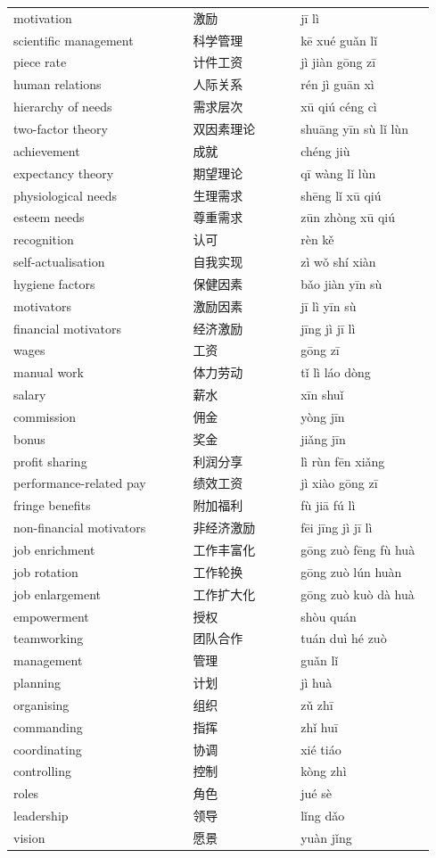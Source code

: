 \documentclass[11pt]{article}
\begin{document}
\begin{longtable}{@{}p{0.40\linewidth}p{0.24\linewidth}p{0.30\linewidth}@{}}
motivation & 激励 & jī lì \\
scientific management & 科学管理 & kē xué guǎn lǐ \\
piece rate & 计件工资 & jì jiàn gōng zī \\
human relations & 人际关系 & rén jì guān xì \\
hierarchy of needs & 需求层次 & xū qiú céng cì \\
two-factor theory & 双因素理论 & shuāng yīn sù lǐ lùn \\
achievement & 成就 & chéng jiù \\
expectancy theory & 期望理论 & qī wàng lǐ lùn \\
physiological needs & 生理需求 & shēng lǐ xū qiú \\
esteem needs & 尊重需求 & zūn zhòng xū qiú \\
recognition & 认可 & rèn kě \\
self-actualisation & 自我实现 & zì wǒ shí xiàn \\
hygiene factors & 保健因素 & bǎo jiàn yīn sù \\
motivators & 激励因素 & jī lì yīn sù \\
financial motivators & 经济激励 & jīng jì jī lì \\
wages & 工资 & gōng zī \\
manual work & 体力劳动 & tǐ lì láo dòng \\
salary & 薪水 & xīn shuǐ \\
commission & 佣金 & yòng jīn \\
bonus & 奖金 & jiǎng jīn \\
profit sharing & 利润分享 & lì rùn fēn xiǎng \\
performance-related pay & 绩效工资 & jì xiào gōng zī \\
fringe benefits & 附加福利 & fù jiā fú lì \\
non-financial motivators & 非经济激励 & fēi jīng jì jī lì \\
job enrichment & 工作丰富化 & gōng zuò fēng fù huà \\
job rotation & 工作轮换 & gōng zuò lún huàn \\
job enlargement & 工作扩大化 & gōng zuò kuò dà huà \\
empowerment & 授权 & shòu quán \\
teamworking & 团队合作 & tuán duì hé zuò \\
management & 管理 & guǎn lǐ \\
planning & 计划 & jì huà \\
organising & 组织 & zǔ zhī \\
commanding & 指挥 & zhǐ huī \\
coordinating & 协调 & xié tiáo \\
controlling & 控制 & kòng zhì \\
roles & 角色 & jué sè \\
leadership & 领导 & lǐng dǎo \\
vision & 愿景 & yuàn jǐng \\
\end{longtable}
\end{document}
